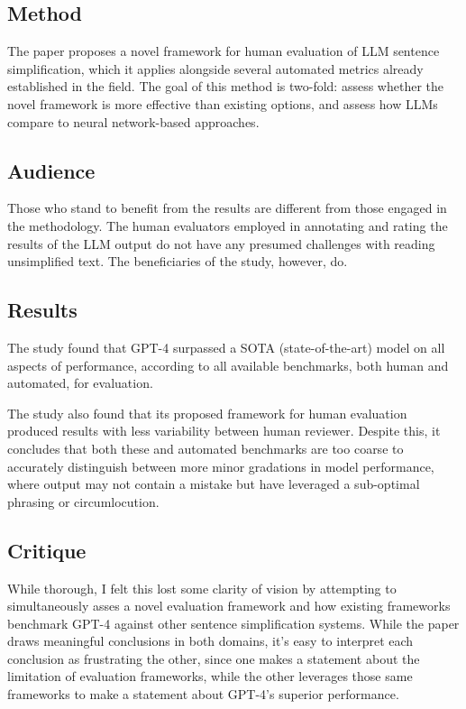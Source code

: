 \documentclass[
	letterpaper, %
]{jdf}
\begin{document}
\subsection{Method}
The paper proposes a novel framework for human evaluation of LLM sentence simplification, which it applies alongside several automated metrics already established in the field. The goal of this method is two-fold: assess whether the novel framework is more effective than existing options, and assess how LLMs compare to neural network-based approaches.

\subsection{Audience}
Those who stand to benefit from the results are different from those engaged in the methodology. The human evaluators employed in annotating and rating the results of the LLM output do not have any presumed challenges with reading unsimplified text. The beneficiaries of the study, however, do.

\subsection{Results}
The study found that GPT-4 surpassed a SOTA (state-of-the-art) model on all aspects of performance, according to all available benchmarks, both human and automated, for evaluation.

The study also found that its proposed framework for human evaluation produced results with less variability between human reviewer. Despite this, it concludes that both these and automated benchmarks are too coarse to accurately distinguish between more minor gradations in model performance, where output may not contain a mistake but have leveraged a sub-optimal phrasing or circumlocution.

\subsection{Critique}
While thorough, I felt this lost some clarity of vision by attempting to simultaneously asses a novel evaluation framework and how existing frameworks benchmark GPT-4 against other sentence simplification systems. While the paper draws meaningful conclusions in both domains, it's easy to interpret each conclusion as frustrating the other, since one makes a statement about the limitation of evaluation frameworks, while the other leverages those same frameworks to make a statement about GPT-4's superior performance.
\end{document}

